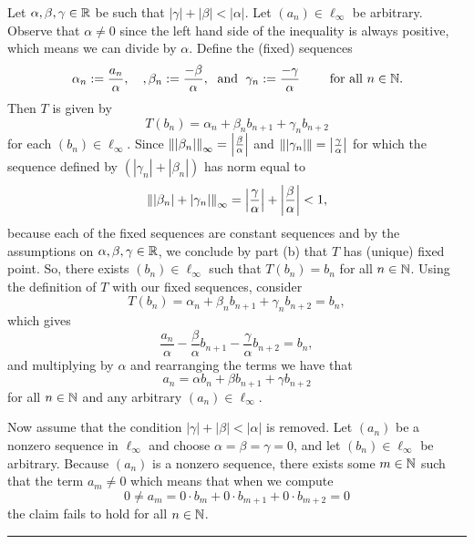\documentclass{article}
\begin{document}
Let $\alpha, \beta, \gamma \in \mathbb R$ be such that $|\gamma| + |\beta| < |\alpha|$. Let $(a_n)\in\ell_\infty$ be arbitrary. Observe that $\alpha \neq 0$ since the left hand side of the inequality is always positive, which means we can divide by $\alpha$. Define the (fixed) sequences 
	\[ \alpha_n := \frac{a_n}{\alpha}, \quad, \beta_n:= \frac{-\beta}{\alpha}, \;\text{ and } \; \gamma_n := \frac{-\gamma}{\alpha} \quad \quad \text{ for all } n\in \mathbb N.\]
Then $T$ is given by
	\[T(b_n) = \alpha_n + \beta_n b_{n+1} + \gamma_n b_{n+2}\]
for each $(b_n)\in\ell_\infty$. Since $\left\lVert {|\beta_n|} \right\rVert_\infty =  \left| \frac{\beta}{\alpha}\right|$ and $\left\lVert {|\gamma_n|} \right\rVert = \left| \frac{\gamma}{\alpha}\right|$ for which the sequence defined by $(|\gamma_n| +|\beta_n|)$ has norm equal to 
	\[\left\lVert {|\beta_n| + |\gamma_n|} \right\rVert_\infty =\left| \frac{\gamma}{\alpha}\right| + \left| \frac{\beta}{\alpha}\right| < 1,\] 
because each of the fixed sequences are constant sequences and by the assumptions on $\alpha, \beta, \gamma\in\mathbb R$, we conclude by part (b) that $T$ has (unique) fixed point. So, there exists $(b_n)\in\ell_\infty$ such that $T(b_n) = b_n$ for all $n\in \mathbb N$. Using the definition of $T$ with our fixed sequences, consider
	\[T(b_n) = \alpha_n + \beta_n b_{n+1} + \gamma_n b_{n+2} = b_n,\]
which gives
	\[ \frac{a_n}{\alpha} - \frac{\beta}{\alpha} b_{n+1} - \frac{\gamma}{\alpha} b_{n+2} = b_n,\]
and multiplying by $\alpha$ and rearranging the terms we have that 
	\[a_n = \alpha b_n + \beta b_{n+1} + \gamma b_{n+2}\]
for all $n\in \mathbb N$ and any arbitrary $(a_n) \in \ell_\infty$.


Now assume that the condition $|\gamma| + |\beta| < |\alpha|$ is removed. Let $(a_n)$ be a nonzero sequence in $\ell_\infty$ and choose $\alpha = \beta = \gamma = 0$, and let $(b_n)\in \ell_\infty$ be arbitrary. Because $(a_n)$ is a nonzero sequence, there exists some $m\in\mathbb N$ such that the term $a_m\neq 0$ which means that when we compute
	\[0\neq a_m = 0\cdot b_m + 0\cdot b_{m+1} + 0\cdot b_{m+2} = 0\]
the claim fails to hold for all $n\in \mathbb N$.\\

\hrule
\end{document}
